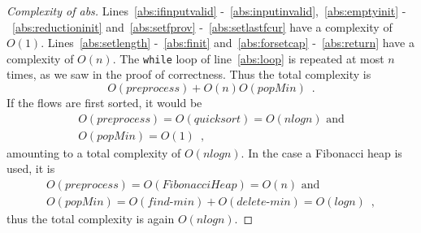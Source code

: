 \begin{proof}[Complexity of abs]
  Lines~\ref{abs:ifinputvalid} -~\ref{abs:inputinvalid},~\ref{abs:emptyinit} -~\ref{abs:reductioninit} and~\ref{abs:setfprov}
  -~\ref{abs:setlastfcur} have a complexity of $O\left(1\right)$. Lines~\ref{abs:setlength} -~\ref{abs:finit}
  and~\ref{abs:forsetcap} -~\ref{abs:return} have a complexity of $O\left(n\right)$. The \texttt{while} loop of
  line~\ref{abs:loop} is repeated at most $n$ times, as we saw in the proof of correctness. Thus the total complexity is
  \begin{equation*}
    O\left(preprocess\right) + O\left(n\right)O\left(popMin\right) \enspace.
  \end{equation*}
  If the flows are first sorted, it would be
  \begin{equation*}
  \begin{gathered}
    O\left(preprocess\right) = O\left(quicksort\right) = O\left(nlogn\right) \mbox{ and} \\
    O\left(popMin\right) = O\left(1\right) \enspace,
  \end{gathered}
  \end{equation*}
  amounting to a total complexity of $O\left(nlogn\right)$. In the case a Fibonacci heap is used, it is
  \begin{equation*}
  \begin{gathered}
    O\left(preprocess\right) = O\left(FibonacciHeap\right) = O\left(n\right) \mbox{ and} \\
    O\left(popMin\right) = O\left(find\mbox{-}min\right) + O\left(delete\mbox{-}min\right) = O\left(logn\right) \enspace,
  \end{gathered}
  \end{equation*}
  thus the total complexity is again $O\left(nlogn\right)$.
\end{proof}
